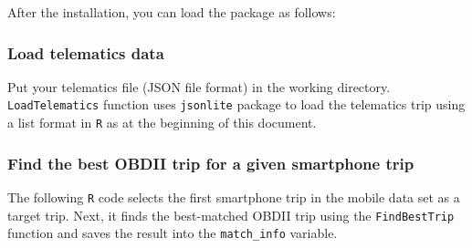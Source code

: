 \documentclass[letterpaper,9pt,twocolumn,twoside,]{pinp}
\begin{document}
After the installation, you can load the package as follows:

\begin{Shaded}
\begin{Highlighting}[]
\end{Highlighting}
\end{Shaded}

\hypertarget{load-telematics-data}{%
\subsubsection{Load telematics data}\label{load-telematics-data}}

Put your telematics file (JSON file format) in the working directory.
\texttt{LoadTelematics} function uses \texttt{jsonlite} package to load
the telematics trip using a list format in \texttt{R} as at the
beginning of this document.

\begin{Shaded}
\begin{Highlighting}[]
\StringTok{ }\NormalTok{(}\NormalTok{)}
\StringTok{ }\NormalTok{(}\NormalTok{)}
\end{Highlighting}
\end{Shaded}

\hypertarget{find-the-best-obdii-trip-for-a-given-smartphone-trip}{%
\subsubsection{Find the best OBDII trip for a given smartphone
trip}\label{find-the-best-obdii-trip-for-a-given-smartphone-trip}}

The following \texttt{R} code selects the first smartphone trip in the
mobile data set as a target trip. Next, it finds the best-matched OBDII
trip using the \texttt{FindBestTrip} function and saves the result into
the \texttt{match\_info} variable.

\begin{Shaded}
\begin{Highlighting}[]
\StringTok{ }\NormalTok{mobile_data[[}\NormalTok{]]}

\StringTok{ }
\end{Highlighting}
\end{Shaded}
\end{document}

